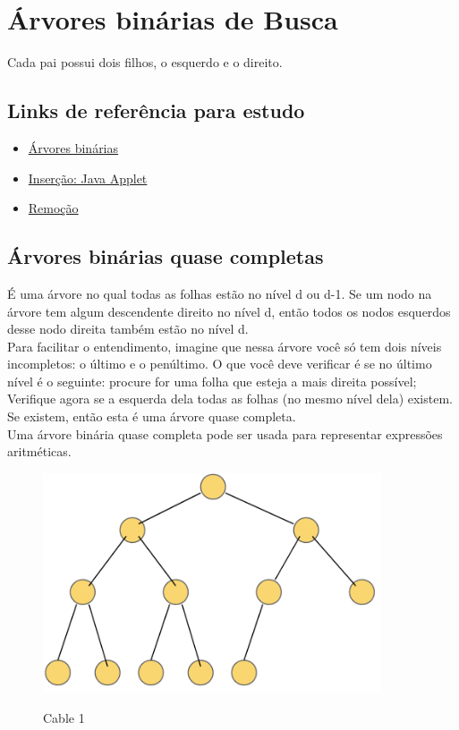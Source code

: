 \documentclass{article}
\begin{document}
\section{Árvores binárias de Busca}
Cada pai possui dois filhos, o esquerdo e o direito.

\subsection{Links de referência para estudo}
\begin{itemize}
	\item \href{http://equipe.nce.ufrj.br/adriano/c/apostila/arvore.htm}{Árvores binárias}
	\item \href{http://www.cs.jhu.edu/~goodrich/dsa/trees/btree.html}{Inserção: Java Applet}
	\item \href{http://www.lcad.icmc.usp.br/~nonato/ED/Arvore\_Binaria/node66.html}{Remoção}
\end{itemize}

\newpage

\subsection{Árvores binárias quase completas}

É uma árvore no qual todas as folhas estão no nível d ou d-1. Se um nodo na árvore tem algum
descendente direito no nível d, então todos os nodos esquerdos desse nodo direita também estão
no nível d.\\

Para facilitar o entendimento, imagine que nessa árvore você só tem dois níveis
incompletos: o último e o penúltimo. O que você deve verificar é se no último nível é o seguinte:
procure for uma folha que esteja a mais direita possível; Verifique agora se a esquerda dela todas
as folhas (no mesmo nível dela) existem. Se existem, então esta é uma árvore quase completa.\\

Uma árvore binária quase completa pode ser usada para representar expressões aritméticas.

\begin{figure}[h]
    \center
    \includegraphics[width=10cm]{imagens/arvquasecompleta.png}
    \label{cable}
    \caption{Cable 1}
\end{figure}
\end{document}
